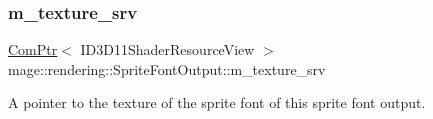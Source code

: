 \subsubsection{\texorpdfstring{m\+\_\+texture\+\_\+srv}{m\_texture\_srv}}
{\footnotesize\ttfamily \hyperlink{namespacemage_ae74f374780900893caa5555d1031fd79}{Com\+Ptr}$<$ I\+D3\+D11\+Shader\+Resource\+View $>$ mage\+::rendering\+::\+Sprite\+Font\+Output\+::m\+\_\+texture\+\_\+srv}

A pointer to the texture of the sprite font of this sprite font output. 